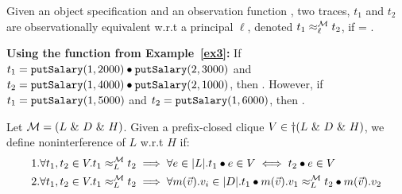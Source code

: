 \documentclass[acmsmall,screen,review, nonacm]{acmart}
\begin{document}
\begin{definition}\label{def:obsim}
Given an object specification \classpart and an observation function \obsymbol,  two traces, $t_1$ and $t_2$ are observationally equivalent w.r.t a principal $\ell$, denoted $t_1 \obsim{\ell}{\classpart} t_2$, if  =  .
\end{definition}


\textbf{Using the \obsymbol function from Example~\ref{ex3}: }
If $t_1 = \mycode{putSalary}(1, 2000) \tracecat \mycode{putSalary}(2, 3000)$ and  $t_2 = \mycode{putSalary}(1, 4000) \tracecat \mycode{putSalary}(2, 1000)$, then .
However, if $t_1 = \mycode{putSalary}(1, 5000)$ and  $t_2 = \mycode{putSalary}(1, 6000)$, then   .


\begin{definition}\label{def:relaxni}
   Let $\classpart = (L \directprod D \directprod H)$. Given a prefix-closed clique $V \in \dagger(L \directprod D \directprod H)$, we define noninterference of $L$ w.r.t $H$ if:
  \begin{align*}
   & 1. \forall t_1, t_2 \in V. \treq{t_1}{t_2}{L}{\classpart}  \implies \forall e \in \abs{L}. t_1  \tracecat e \in V \iff t_2 \tracecat e \in V  \\
   & 2. \forall t_1, t_2 \in V. \treq{t_1}{t_2}{L}{\classpart}  \implies \forall m(\vec{v}).v_i \in \abs{D}. \treq{t_1  \tracecat  m(\vec{v}).v_1}{t_2 \tracecat  m(\vec{v}).v_2}{L}{\classpart}
  \end{align*}
\end{definition}



\end{document}
